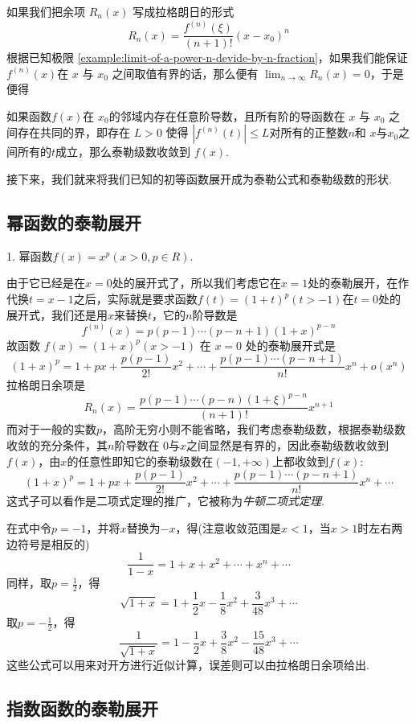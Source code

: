 如果我们把余项 $R_n(x)$ 写成拉格朗日的形式
\[ R_n(x) = \frac{f^{(n)}(\xi)}{(n+1)!}(x-x_0)^n \]
根据已知极限 \autoref{example:limit-of-a-power-n-devide-by-n-fraction}，如果我们能保证 $f^{(n)}(x)$在 $x$ 与 $x_0$ 之间取值有界的话，那么便有 $\lim_{n\to\infty}R_n(x)=0$，于是便得
\begin{theorem}
  如果函数$f(x)$在 $x_0$的邻域内存在任意阶导数，且所有阶的导函数在 $x$ 与 $x_0$ 之间存在共同的界，即存在 $L>0$ 使得 $|f^{(n)}(t)|\leqslant L$对所有的正整数$n$和 $x$与$x_0$之间所有的$t$成立，那么泰勒级数收敛到 $f(x)$.
\end{theorem}

接下来，我们就来将我们已知的初等函数展开成为泰勒公式和泰勒级数的形状.

\subsection{幂函数的泰勒展开}
\label{sec:taylor-expand-for-power-function}


1. 幂函数$f(x)=x^p(x>0,p\in R)$.

由于它已经是在$x=0$处的展开式了，所以我们考虑它在$x=1$处的泰勒展开，在作代换$t=x-1$之后，实际就是要求函数$f(t)=(1+t)^p(t>-1)$在$t=0$处的展开式，我们还是用$x$来替换$t$，它的$n$阶导数是
\[ f^{(n)}(x) = p(p-1)\cdots (p-n+1)(1+x)^{p-n} \]
故函数 $f(x)=(1+x)^p(x>-1)$ 在 $x=0$ 处的泰勒展开式是
\[ (1+x)^p = 1 + px + \frac{p(p-1)}{2!}x^2 + \cdots + \frac{p(p-1)\cdots (p-n+1)}{n!}x^n + o(x^n) \]
拉格朗日余项是
\[ R_n(x) = \frac{p(p-1)\cdots (p-n)(1+\xi)^{p-n}}{(n+1)!}x^{n+1} \]
而对于一般的实数$p$，高阶无穷小则不能省略，我们考虑泰勒级数，根据泰勒级数收敛的充分条件，其$n$阶导数在 $0$与$x$之间显然是有界的，因此泰勒级数收敛到$f(x)$，由$x$的任意性即知它的泰勒级数在$(-1,+\infty)$上都收敛到$f(x)$:
\[ (1+x)^p = 1+px+\frac{p(p-1)}{2!}x^2+\cdots+\frac{p(p-1)\cdots(p-n+1)}{n!}x^n+\cdots \]
这式子可以看作是二项式定理的推广，它被称为\emph{牛顿二项式定理}.

在式中令$p=-1$，并将$x$替换为$-x$，得(注意收敛范围是$x<1$，当$x>1$时左右两边符号是相反的)
\[ \frac{1}{1-x} = 1+x+x^2 + \cdots + x^n + \cdots \]
同样，取$p=\frac{1}{2}$，得
\[ \sqrt{1+x} = 1+\frac{1}{2}x-\frac{1}{8}x^2+\frac{3}{48}x^3 + \cdots \]
取$p=-\frac{1}{2}$，得
\[ \frac{1}{\sqrt{1+x}} = 1-\frac{1}{2}x+\frac{3}{8}x^2 -\frac{15}{48}x^3 + \cdots \]
这些公式可以用来对开方进行近似计算，误差则可以由拉格朗日余项给出.

\subsection{指数函数的泰勒展开}
\label{sec:taylor-expand-for-exp-function}

